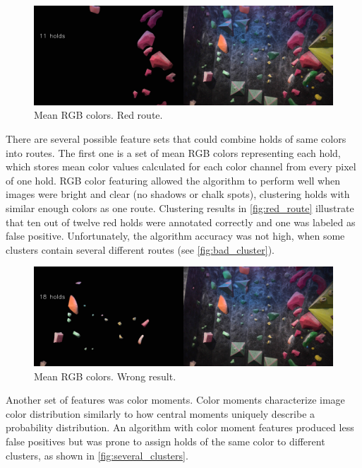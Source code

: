 \documentclass[final]{cvpr}
\begin{document}
\begin{figure}[h]
\centering
\includegraphics[width = \linewidth]{img/routes_std/red_holds.jpg}
\caption{Mean RGB colors. Red route.}
\label{fig:red_route}
\end{figure}

There are several possible feature sets that could combine holds of same colors into routes. The first one is a set of mean RGB colors \cite{meancolorclustering} representing each hold, which stores mean color values calculated for each color channel from every pixel of one hold. RGB color featuring allowed the algorithm to perform well when images were bright and clear (no shadows or chalk spots), clustering holds with similar enough colors as one route. Clustering results in \autoref{fig:red_route} illustrate that ten out of twelve red holds were annotated correctly and one was labeled as false positive. Unfortunately, the algorithm accuracy was not high, when some clusters contain several different routes (see \autoref{fig:bad_cluster}).

\begin{figure}[h]
\centering
\includegraphics[width = \linewidth]{img/routes_std/bad_cluster.jpg}
\caption{Mean RGB colors. Wrong result.}
\label{fig:bad_cluster}
\end{figure}

Another set of features was color moments. Color moments characterize image color distribution similarly to how central moments uniquely describe a probability distribution. An algorithm with color moment features produced less false positives but was prone to assign holds of the same color to different clusters, as shown in \autoref{fig:several_clusters}.
\end{document}
